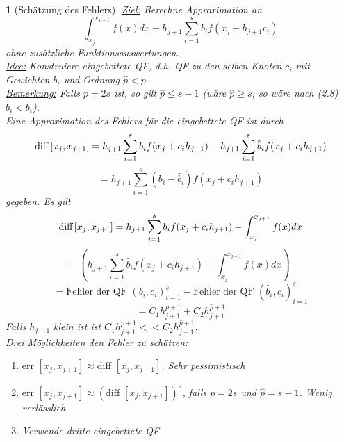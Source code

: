 \documentclass[12pt]{article}
\theoremstyle{break}
\newtheorem{nothing}[theorem]{}
\begin{document}
\begin{nothing}[Schätzung des Fehlers]
\underline{Ziel:} Berechne Approximation an 
$$\int_{x_j}^{x_{x+1}} f(x)dx - h_{j+1} \sum_{i=1}^s b_i f(x_j + h_{j+1} c_i)$$
ohne zusätzliche Funktionsauswertungen.\\
\underline{Idee:} Konstruiere eingebettete QF, d.h. QF zu den selben Knoten $c_i$ mit Gewichten $b_i$ und Ordnung $\hat{p} < p$ \\
\underline{Bemerkung:} Falls $p=2s$ ist, so gilt $\hat{p} \leq s-1$ (wäre $\hat{p} \geq s$, so wäre nach (2.8) $\hat{b}_i < b_i$).\\
Eine Approximation des Fehlers für die eingebettete QF ist durch 
$$\text{diff} \thinspace [x_j, x_{j+1}] = h_{j+1} \sum_{i=1}^s b_i f(x_j + c_i h_{j+1}) - h_{j+1} \sum_{i=1}^s \hat{b}_i f(x_j + c_i h_{j+1})$$
$$ = h_{j+1} \sum_{i=1}^s (b_i - \hat{b}_i) f(x_j+c_i h_{j+1})$$
gegeben. Es gilt
$$\text{diff} \thinspace [x_j, x_{j+1}] = h_{j+1} \sum_{i=1}^s b_i f(x_j + c_i h_{j+1}) - \int_{x_j}^{x_{j+1}} f(x)dx$$ 
$$- \left( h_{j+1} \sum_{i=1}^s \hat{b}_i f(x_j + c_i h_{j+1}) - \int_{x_j}^{x_{j+1}} f(x)dx \right)$$
$$ = \text{Fehler der QF } (b_i, c_i)_{i=1}^s - \text{Fehler der QF } (\hat{b}_i, c_i)_{i=1}^s$$
$$ = C_1 h_{j+1}^{p+1} + C_2h_{j+1}^{\hat{p}+1}$$
Falls $h_{j+1}$ klein ist ist $C_1 h_{j+1}^{p+1} << C_2h_{j+1}^{\hat{p}+1}$.\\
Drei Möglichkeiten den Fehler zu schätzen:
\begin{enumerate}
  \item[I)] $\text{err }[x_j, x_{j+1}] \approx \text{diff }[x_j, x_{j+1}]$. Sehr pessimistisch
  \item[II)] $\text{err }[x_j, x_{j+1}] \approx (\text{diff }[x_j, x_{j+1}])^2$, falls $p=2s$ und $\hat{p} = s-1$. Wenig verlässlich
  \item[III)] Verwende dritte eingebettete QF 
\end{enumerate}
\end{nothing}
\end{document}
